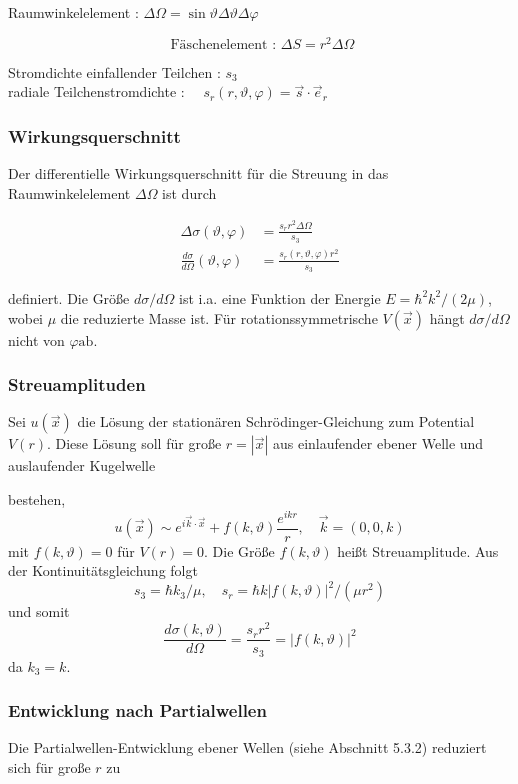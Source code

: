 \documentclass[10pt, letterpaper]{article}
\begin{document}
Raumwinkelelement : $\Delta \Omega=\sin \vartheta \Delta \vartheta \Delta \varphi$

$$
\text { Fäschenelement : } \Delta S=r^{2} \Delta \Omega
$$

Stromdichte einfallender Teilchen : $s_{3}$\\
radiale Teilchenstromdichte : $\quad s_{r}(r, \vartheta, \varphi)=\vec{s} \cdot \vec{e}_{r}$

\subsubsection*{Wirkungsquerschnitt}
Der differentielle Wirkungsquerschnitt für die Streuung in das Raumwinkelelement $\Delta \Omega$ ist durch

$$
\begin{aligned}
\Delta \sigma(\vartheta, \varphi) & =\frac{s_{r} r^{2} \Delta \Omega}{s_{3}} \\
\frac{d \sigma}{d \Omega}(\vartheta, \varphi) & =\frac{s_{r}(r, \vartheta, \varphi) r^{2}}{s_{3}}
\end{aligned}
$$

definiert. Die Größe $d \sigma / d \Omega$ ist i.a. eine Funktion der Energie $E=\hbar^{2} k^{2} /(2 \mu)$, wobei $\mu$ die reduzierte Masse ist. Für rotationssymmetrische $V(\vec{x})$ hängt $d \sigma / d \Omega$ nicht von $\varphi \mathrm{ab}$.

\subsubsection*{Streuamplituden}
Sei $u(\vec{x})$ die Lösung der stationären Schrödinger-Gleichung zum Potential $V(r)$. Diese Lösung soll für große $r=|\vec{x}|$ aus einlaufender ebener Welle und auslaufender Kugelwelle

bestehen,
$$
u(\vec{x}) \sim e^{i \vec{k} \cdot \vec{x}}+f(k, \vartheta) \frac{e^{i k r}}{r}, \quad \vec{k}=(0,0, k)
$$
mit $f(k, \vartheta)=0$ für $V(r)=0$. Die Größe $f(k, \vartheta)$ heißt Streuamplitude. Aus der Kontinuitätsgleichung folgt
$$
s_{3}=\hbar k_{3} / \mu, \quad s_{r}=\hbar k|f(k, \vartheta)|^{2} /\left(\mu r^{2}\right)
$$
und somit
$$
\frac{d \sigma(k, \vartheta)}{d \Omega}=\frac{s_{r} r^{2}}{s_{3}}=|f(k, \vartheta)|^{2}
$$
da $k_{3}=k$.

\subsubsection*{Entwicklung nach Partialwellen}
Die Partialwellen-Entwicklung ebener Wellen (siehe Abschnitt 5.3.2) reduziert sich für große $r$ zu
\end{document}
